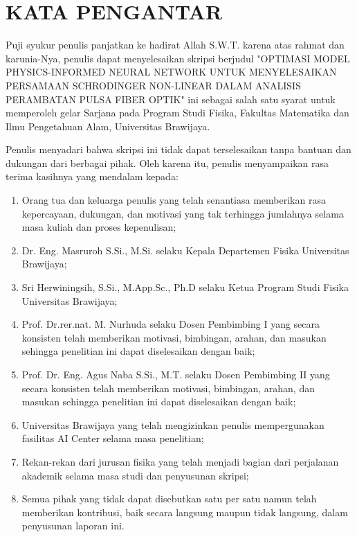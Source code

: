 	\chapter*{KATA PENGANTAR}
	\vspace{1cm}
	
Puji syukur penulis panjatkan ke hadirat Allah S.W.T. karena atas rahmat dan karunia-Nya, penulis dapat menyelesaikan skripsi berjudul "OPTIMASI MODEL PHYSICS-INFORMED NEURAL
NETWORK UNTUK MENYELESAIKAN PERSAMAAN
SCHRODINGER NON-LINEAR DALAM ANALISIS
PERAMBATAN PULSA FIBER OPTIK" ini sebagai salah satu syarat untuk memperoleh gelar Sarjana pada Program Studi Fisika, Fakultas Matematika dan Ilmu Pengetahuan Alam, Universitas Brawijaya. 

Penulis menyadari bahwa skripsi ini tidak dapat terselesaikan tanpa bantuan dan dukungan dari berbagai pihak. Oleh karena itu, penulis menyampaikan rasa terima kasihnya yang mendalam kepada:

\begin{enumerate}[nosep]
    \item Orang tua dan keluarga penulis yang telah senantiasa memberikan rasa kepercayaan, dukungan, dan motivasi yang tak terhingga jumlahnya selama masa kuliah dan proses kepenulisan;
    \item Dr. Eng. Masruroh S.Si., M.Si. selaku Kepala Departemen Fisika Universitas Brawijaya;
    \item Sri Herwiningsih, S.Si., M.App.Sc., Ph.D selaku Ketua Program Studi Fisika Universitas Brawijaya;
    \item Prof. Dr.rer.nat. M. Nurhuda selaku Dosen Pembimbing I yang secara konsisten telah memberikan motivasi, bimbingan, arahan, dan masukan sehingga penelitian ini dapat diselesaikan dengan baik;
    \item Prof. Dr. Eng. Agus Naba S.Si., M.T. selaku Dosen Pembimbing II yang secara konsisten telah memberikan motivasi, bimbingan, arahan, dan masukan sehingga penelitian ini dapat diselesaikan dengan baik;
    \newpage
    \item Universitas Brawijaya yang telah mengizinkan penulis mempergunakan fasilitas AI Center selama masa penelitian;
    \item Rekan-rekan dari jurusan fisika yang telah menjadi bagian dari perjalanan akademik selama masa studi dan penyusunan skripsi;
    \item Semua pihak yang tidak dapat disebutkan satu per satu namun telah memberikan kontribusi, baik secara langsung maupun tidak langsung, dalam penyusunan laporan ini.
\end{enumerate}

